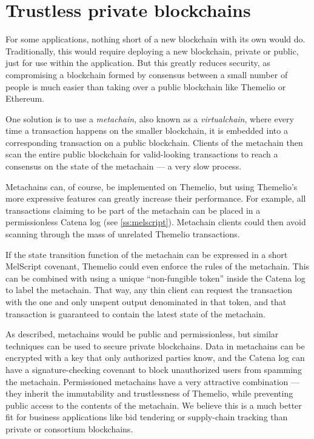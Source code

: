 \documentclass[headinclude,12pt]{scrbook}
\begin{document}
\section{Trustless private blockchains}

For some applications, nothing short of a new blockchain with its own would do. Traditionally, this would require deploying a new blockchain, private or public, just for use within the application. But this greatly reduces security, as compromising a blockchain formed by consensus between a small number of people is much easier than taking over a public blockchain like Themelio or Ethereum.

One solution is to use a \emph{metachain}, also known as a \emph{virtualchain}, where every time a transaction happens on the smaller blockchain, it is embedded into a corresponding transaction on a public blockchain. Clients of the metachain then scan the entire public blockchain for valid-looking transactions to reach a consensus on the state of the metachain --- a very slow process.

Metachains can, of course, be implemented on Themelio, but using Themelio's more expressive features can greatly increase their performance. For example, all transactions claiming to be part of the metachain can be placed in a permissionless Catena log (see \ref{ss:melscript}). Metachain clients could then avoid scanning through the mass of unrelated Themelio transactions.

If the state transition function of the metachain can be expressed in a short MelScript covenant, Themelio could even enforce the rules of the metachain. This can be combined with using a unique ``non-fungible token'' inside the Catena log to label the metachain. That way, any thin client can request the transaction with the one and only unspent output denominated in that token, and that transaction is guaranteed to contain the latest state of the metachain.

As described, metachains would be public and permissionless, but similar techniques can be used to secure private blockchains. Data in metachains can be encrypted with a key that only authorized parties know, and the Catena log can have a signature-checking covenant to block unauthorized users from spamming the metachain. Permissioned metachains have a very attractive combination --- they inherit the immutability and trustlessness of Themelio, while preventing public access to the contents of the metachain. We believe this is a much better fit for business applications like bid tendering or supply-chain tracking than private or consortium blockchains.
\end{document}
